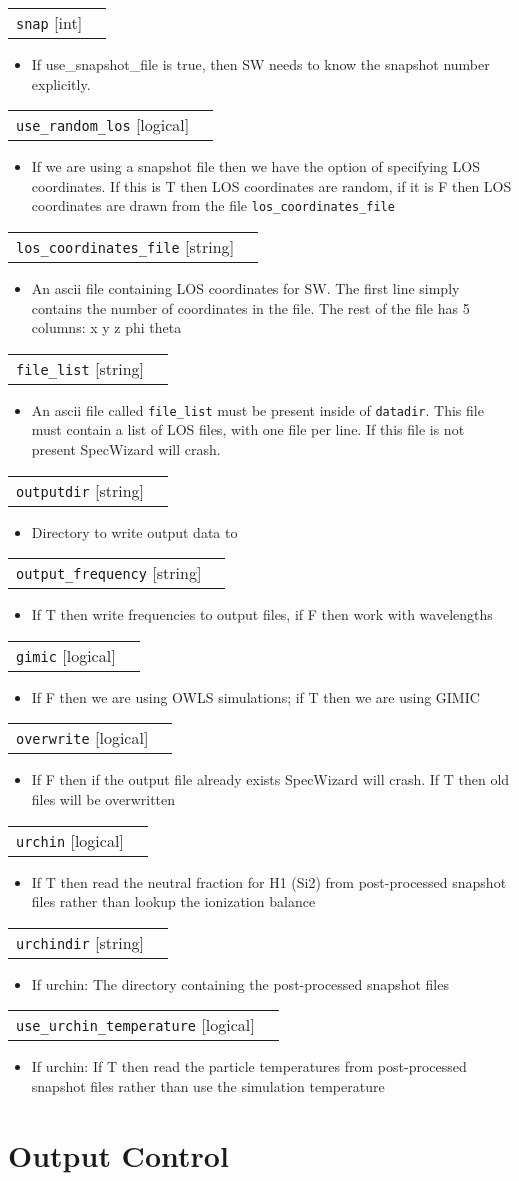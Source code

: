 \documentclass{report}
\makeatletter
\newcommand{\paramdefinition}[3]{
\begin{tabular*}{\textwidth}{l@{\extracolsep{\fill}}r}
		{\tt #1} [{\sc #2}]& #3 \\
\end{tabular*}}
\newcommand{\paramdescription}[1]{
\begin{itemize}
\item #1
\end{itemize}\vspace{0.2cm}}
\makeatother
\begin{document}
\paramdefinition{snap}{int}{}
\paramdescription{If use\_snapshot\_file is true, then SW needs to know the snapshot number explicitly.}

\paramdefinition{use\_random\_los}{logical}{}
\paramdescription{If we are using a snapshot file then we have the option of specifying LOS coordinates.  If this is T then LOS coordinates are random, if it is F then LOS coordinates are drawn from the file {\tt los\_coordinates\_file}}

\paramdefinition{los\_coordinates\_file}{string}{}
\paramdescription{An ascii file containing LOS coordinates for SW. The first line simply contains the number of coordinates in the file. The rest of the file has 5 columns: x y z phi theta}

\paramdefinition{file\_list}{string}{}
\paramdescription{An ascii file called {\tt file\_list} must be present inside of {\tt datadir}.  This file must contain a list of LOS files, with one file per line.  If this file is not present SpecWizard will crash.}

\paramdefinition{outputdir}{string}{}
\paramdescription{Directory to write output data to}

\paramdefinition{output\_frequency}{string}{}
\paramdescription{If T then write frequencies to output files, if F then work with wavelengths}

\paramdefinition{gimic}{logical}{}
\paramdescription{If F then we are using OWLS simulations; if T then we are using GIMIC}

\paramdefinition{overwrite}{logical}{}
\paramdescription{If F then if the output file already exists SpecWizard will crash.  If T then old files will be overwritten}

\paramdefinition{urchin}{logical}{}
\paramdescription{If T then read the neutral fraction for H1 (Si2) from post-processed snapshot files rather than lookup the ionization balance}

\paramdefinition{urchindir}{string}{}
\paramdescription{If urchin: The directory containing the post-processed snapshot files}

\paramdefinition{use\_urchin\_temperature}{logical}{}
\paramdescription{If urchin: If T then read the particle temperatures from post-processed snapshot files rather than use the simulation temperature}

\section{Output Control}
\end{document}
